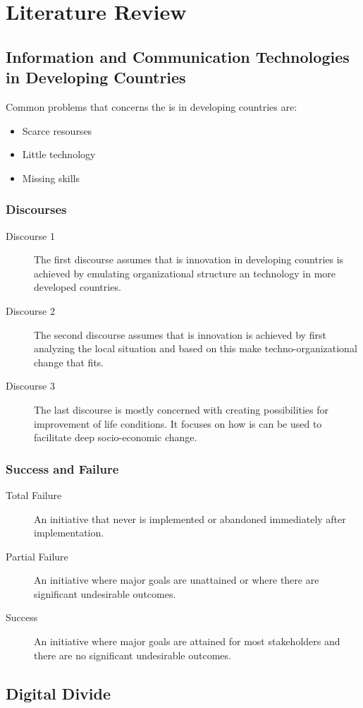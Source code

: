 \chapter{Literature Review}

\section{Information and Communication Technologies in Developing Countries}

Common problems that concerns the \gls{is} in developing countries are:
\begin{itemize}
\item Scarce resourses
\item Little technology
\item Missing skills
\end{itemize}

\subsection{Discourses}
\label{subsec:discourses}
\begin{description}
\item[Discourse 1]
	The first discourse assumes that \gls{is} innovation in developing countries is achieved by emulating organizational structure an technology in more developed countries. 
\item[Discourse 2]
	The second discourse assumes that \gls{is} innovation is achieved by first analyzing the local situation and based on this make techno-organizational change that fits.
\item[Discourse 3]
	The last discourse is mostly concerned with creating possibilities for improvement of life conditions. It focuses on how \gls{is} can be used to facilitate deep socio-economic change.
\end{description}

\cite{ca:isdc}


\subsection{Success and Failure}
\label{successandfailure}
\begin{description}
\item[Total Failure] An initiative that never is implemented or abandoned immediately after implementation.
\item[Partial Failure] An initiative where major goals are unattained or where there are significant undesirable outcomes.
\item[Success] An initiative where major goals are attained for most stakeholders and there are no significant undesirable outcomes.
\end{description}



\cite{rh:isdc}


\section{Digital Divide}
